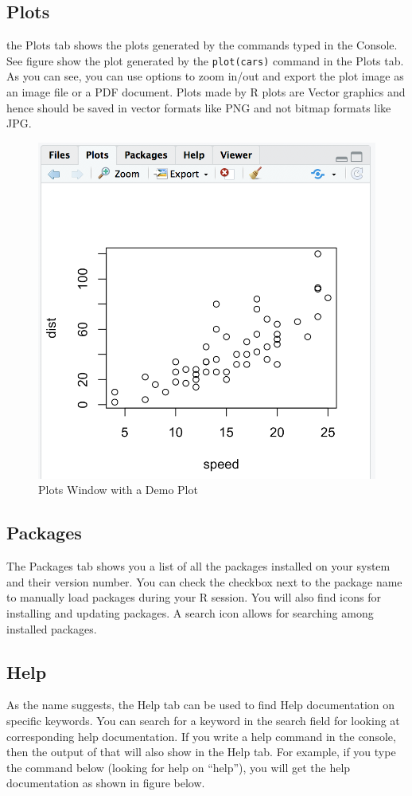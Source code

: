 \documentclass[]{krantz}
\begin{document}
\subsection{Plots}\label{plots}

the Plots tab shows the plots generated by the commands typed in the
Console. See figure show the plot generated by the \texttt{plot(cars)}
command in the Plots tab. As you can see, you can use options to zoom
in/out and export the plot image as an image file or a PDF document.
Plots made by R plots are Vector graphics and hence should be saved in
vector formats like PNG and not bitmap formats like JPG.

\begin{figure}

{\centering \includegraphics[width=0.5\linewidth]{images/plots} 

}

\caption{Plots Window with a Demo Plot}\label{fig:unnamed-chunk-7}
\end{figure}

\subsection{Packages}\label{packages}

The Packages tab shows you a list of all the packages installed on your
system and their version number. You can check the checkbox next to the
package name to manually load packages during your R session. You will
also find icons for installing and updating packages. A search icon
allows for searching among installed packages.

\subsection{Help}\label{help}

As the name suggests, the Help tab can be used to find Help
documentation on specific keywords. You can search for a keyword in the
search field for looking at corresponding help documentation. If you
write a help command in the console, then the output of that will also
show in the Help tab. For example, if you type the command below
(looking for help on ``help''), you will get the help documentation as
shown in figure below.
\end{document}
